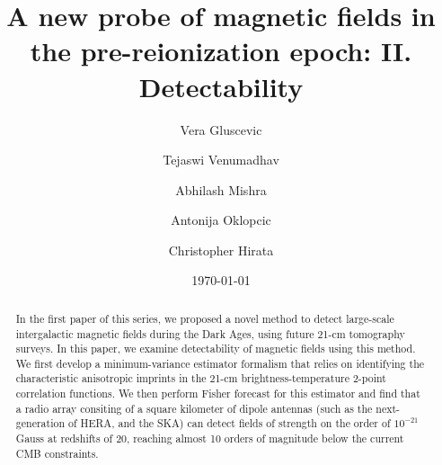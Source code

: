 \documentclass[aps,prd,twocolumn,floatfix,showpacs,superscriptaddress,nofootinbib]{revtex4-1}
\begin{document}
\widetext
\title{A new probe of magnetic fields in the pre-reionization epoch: II. Detectability}
\author{Vera Gluscevic}
\author{Tejaswi Venumadhav}
\author{Abhilash Mishra} 
\author{Antonija Oklopcic}
\author{Christopher Hirata}
\date{\today}
 

\begin{abstract}
In the first paper of this series, we proposed a novel method to detect large-scale intergalactic magnetic fields during the Dark Ages, using future 21-cm tomography surveys. In this paper, we examine detectability of magnetic fields using this method. We first develop a minimum-variance estimator formalism that relies on identifying the characteristic anisotropic imprints in the 21-cm brightness-temperature 2-point correlation functions. We then perform Fisher forecast for this estimator and find that a radio array consiting of a square kilometer of dipole antennas (such as the next-generation of HERA, and the SKA) can detect fields of strength on the order of $10^{-21}$ Gauss at redshifts of 20, reaching almost 10 orders of magnitude below the current CMB constraints. 
\end{abstract} 
  
\pacs{} 
\maketitle

\vspace{-15pt}






  
\appendix 

\label{app:Vrms}
\appendix 

\label{app:lensing}



\end{document}

